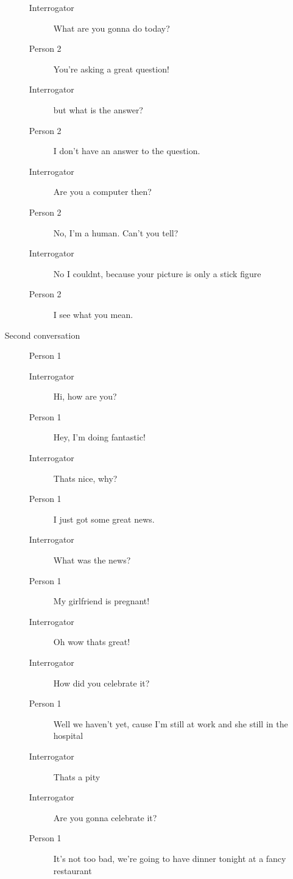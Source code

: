 \begin{itemize}
\begin{description}
\begin{description}
               \item [Interrogator] What are you gonna do today?
               \item [Person 2] You're asking a great question!
               \item [Interrogator] but what is the answer?
               \item [Person 2] I don't have an answer to the question.
               \item [Interrogator] Are you a computer then?
               \item [Person 2] No, I'm a human. Can't you tell?
               \item [Interrogator] No I couldnt, because your picture is only a stick figure
               \item [Person 2] I see what you mean.
            \end{description}

         \item [Second conversation] Person 1
            \begin{description}
               \item [Interrogator] Hi, how are you?
               \item [Person 1] Hey, I'm doing fantastic!
               \item [Interrogator] Thats nice, why?
               \item [Person 1] I just got some great news.
               \item [Interrogator] What was the news?
               \item [Person 1] My girlfriend is pregnant!
               \item [Interrogator] Oh wow thats great!
               \item [Interrogator] How did you celebrate it?
               \item [Person 1] Well we haven't yet, cause I'm still at work and she still in the hospital
               \item [Interrogator] Thats a pity
               \item [Interrogator] Are you gonna celebrate it?
               \item [Person 1] It's not too bad, we're going to have dinner tonight at a fancy restaurant
            \end{description}
      \end{description}


\end{itemize}
